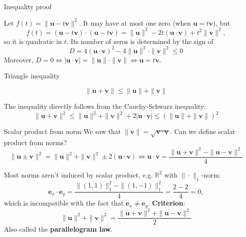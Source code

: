 \documentclass[10pt]{beamer}
\begin{document}
\begin{frame}{Inequality proof}
    \begin{center}
        
    \end{center}
    Let $f(t) = \|\mathbf u - t \mathbf v\|^2$. It may have at most one zero (when $\mathbf u = t \mathbf v$), but
    $$
    f(t) = (\mathbf u - t \mathbf v)\cdot (\mathbf u - t \mathbf v) = \|\mathbf u\|^2 - 2t(\mathbf u \cdot \mathbf v) + t^2 \|\mathbf v\|^2,
    $$
    so it is quadratic in $t$. Its number of zeros is determined by the sign of
    $$
    D = 4(\mathbf u \cdot \mathbf v)^2 - 4 \|\mathbf u\|^2 \cdot \|\mathbf v\|^2 \leq 0
    $$
    Moreover, $D=0 \iff |\mathbf u \cdot \mathbf v| = \|\mathbf u\| \cdot \|\mathbf v\| \iff \mathbf u = t \mathbf v$.
\end{frame}

\begin{frame}{Triangle inequality}
    \begin{center}
        
    \end{center}
    $$\|\mathbf u + \mathbf v \| \leq \|\mathbf u\| + \|\mathbf v\|$$

    The inequality directly follows from the Cauchy-Schwarz inequality:
    $$\|\mathbf u + \mathbf v\|^2 \leq \|\mathbf u \|^2 + \|\mathbf v \|^2 + 2 |\mathbf u \cdot \mathbf v| \leq (\|\mathbf u\| + \|\mathbf v\|)^2$$
\end{frame}

\begin{frame}{Scalar product from norm}
    We saw that $\|\mathbf v\| = \sqrt{\mathbf v \cdot \mathbf v}$. Can we define scalar product from norms?
    $$
    \|\mathbf u \pm \mathbf v\|^2 = \|\mathbf u\|^2 + \|\mathbf v\|^2 \pm 2 (\mathbf u \cdot \mathbf v) \iff \mathbf u \cdot \mathbf v = \frac{\|\mathbf u + \mathbf v\|^2 - \|\mathbf u - \mathbf v\|^2}{4}
    $$

    Most norms aren't induced by scalar product, e.g. $\mathbb R^2$ with $\|\cdot \|_1$-norm:
    $$
    \mathbf e_x \cdot \mathbf e_y = \frac{\|(1,1)\|_1^2-\|(1,-1)\|^2_1}{4} = \frac{2-2}{4} = 0,
    $$
    which is incompatible with the fact that $\mathbf e_x \neq \mathbf e_y$. \textbf{Criterion}:
    $$
    \|\mathbf u\|^2+\|\mathbf v\|^2 = \frac{\|\mathbf u + \mathbf v\|^2+\|\mathbf u - \mathbf v\|^2}{2}
    $$
    Also called the \textbf{parallelogram law}.
\end{frame}
\end{document}
